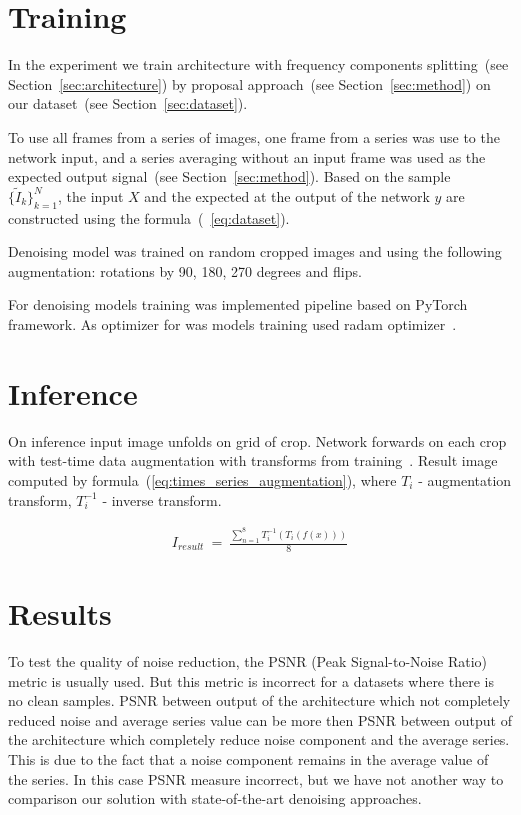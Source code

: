 \documentclass[runningheads]{llncs}
\begin{document}
\section{Training}

In the experiment we train architecture with frequency components splitting~(see Section~\ref{sec:architecture}) by proposal approach~(see Section~\ref{sec:method}) on our dataset~(see Section~\ref{sec:dataset}).

To use all frames from a series of images, one frame from a series was use to the network input, and a series averaging without an input frame was used as the expected output signal~(see Section~\ref{sec:method}). Based on the sample \\$\{\tilde{I} _k\} _ {k=1}^{N}$, the input $X$ and the expected at the output of the network $y$ are constructed using the formula~(~\ref{eq:dataset}).

Denoising model was trained on random cropped images and using the following augmentation: rotations by 90, 180, 270 degrees and flips.

For denoising models training was implemented pipeline based on PyTorch framework. As optimizer for was models training used radam optimizer~\cite{radam_paper}.

\section{Inference}
On inference input image unfolds on grid of crop. Network forwards on each crop with test-time data augmentation with transforms from training~\cite{test_ts_augmentations_paper}. Result image computed by formula~(\ref{eq:times_series_augmentation}), where $T_{i}$ - augmentation transform, $T_{i}^{-1}$ - inverse transform.

\begin{eqnarray}\label{eq:times_series_augmentation}
I_{result}\ =\ \frac{\sum_{n=1}^{8} T_{i}^{-1}(T_{i}(f(x)))}{8}
\end{eqnarray}


\section{Results}
To test the quality of noise reduction, the PSNR (Peak Signal-to-Noise Ratio) metric is usually used. But this metric is incorrect for a datasets where there is no clean samples. PSNR between output of the architecture which not completely reduced noise and average series value can be more then PSNR between output of the architecture which completely reduce noise component and the average series. This is due to the fact that a noise component remains in the average value of the series. In this case PSNR measure incorrect, but we have not another way to comparison our solution with state-of-the-art denoising approaches.
\end{document}
